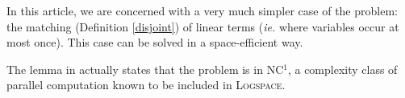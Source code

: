 \smallskip
In this article, we are concerned with a very much simpler case of the problem: the matching (Definition \ref{disjoint}) of linear terms (\textit{ie.} where variables occur at most once).
This case can be solved in a space-efficient way.


The lemma in \cite{dwork_parallel_1988} actually states that the problem is in \textsc{NC$^1$}, a complexity class of parallel computation known to be included in \textsc{Logspace}.
